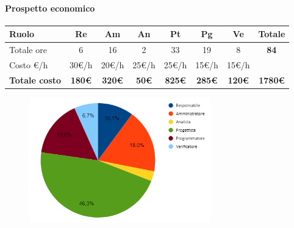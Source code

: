 \paragraph{Prospetto economico}
\begin{center}
	\renewcommand{\arraystretch}{1.8} %
	\begin{tabular}{ |m{10em}|c|c|c|c|c|c|c| }
	\hline
	\textbf{Ruolo} & \textbf{Re} & \textbf{Am} &  \textbf{An} &  \textbf{Pt} &  \textbf{Pg} &  \textbf{Ve} &  \textbf{Totale}\\
    \hline
    Totale ore & 6 & 16 & 2 & 33 & 19 & 8 & \textbf{84}\\
    \hline
    Costo \euro/h & 30\euro/h & 20\euro/h & 25\euro/h & 25\euro/h & 15\euro/h & 15\euro/h & \\
    \hline
    \textbf{Totale costo} & \textbf{180\euro} & \textbf{320\euro} &  \textbf{50\euro} &  \textbf{825\euro} &  \textbf{285\euro} &  \textbf{120\euro} &  \textbf{1780\euro}\\
    \hline
	\end{tabular}

    \begin{figure}[H]
        \centering\includegraphics[width=0.7\textwidth, height=0.7\textheight, keepaspectratio]{images/preventivo/RTB-tecnologico-costo.png}
    \end{figure}
    
\end{center}

\newpage